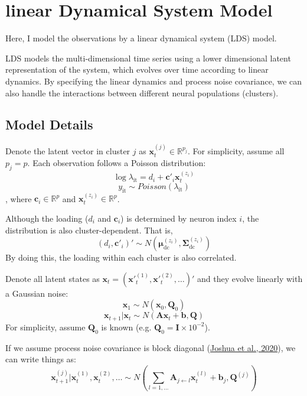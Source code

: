 \documentclass[]{article}
\begin{document}
\section{linear Dynamical System Model}
Here, I model the observations by a linear dynamical system (LDS) model.

LDS models the multi-dimensional time series using a lower dimensional latent representation of the system, which evolves over time according to linear dynamics. By specifying the linear dynamics and process noise covariance, we can also handle the interactions between different neural populations (clusters).

\subsection{Model Details}
Denote the latent vector in cluster \(j\) as
\(\mathbf{x}_{t}^{(j)} \in \mathbb{R}^{p_{j}}\). For simplicity, assume all \(p_{j} = p\). Each observation follows a Poisson distribution:
\[\log\lambda_{\text{it}} = d_{i} + \mathbf{c'}_{i}\mathbf{x}_{t}^{(z_{i})}\]
\[y_{\text{it}} \sim Poisson(\lambda_{\text{it}})\]
, where \(\mathbf{c}_{i} \in \mathbb{R}^{p}\) and
\(\mathbf{x}_{t}^{(z_{i})} \in \mathbb{R}^{p}\).

Although the loading (\(d_{i}\) and \(\mathbf{c}_{i}\)) is determined by neuron index \(i\), the distribution is also cluster-dependent. That is,
\[\left( d_{i},\mathbf{c}'_{i} \right)' \sim N(\bm{\mu}_{\text{dc}}^{\left( z_{i} \right)},\mathbf{\Sigma}_{\text{dc}}^{(z_{i})})\]
By doing this, the loading within each cluster is also correlated.

Denote all latent states as \(\mathbf{x}_{t} = \left( {\mathbf{x'}_{t}^{(1)}},{\mathbf{x'}_{t}^{(2)}},\ldots \right)'\) and they evolve linearly with a Gaussian noise:
\[\mathbf{x}_{1} \sim N(\mathbf{x}_{0},\mathbf{Q}_{0})\]
\[\mathbf{x}_{t + 1}|\mathbf{x}_{t} \sim N(\mathbf{A}\mathbf{x}_{t} + \mathbf{b},\mathbf{Q})\]
For simplicity, assume \(\mathbf{Q}_{0}\) is known (e.g.
\(\mathbf{Q}_{0} = \mathbf{I} \times 10^{-2}\)).

If we assume process noise covariance is block diagonal (\href{https://papers.nips.cc/paper/2020/hash/aa1f5f73327ba40d47ebce155e785aaf-Abstract.html}{Joshua et al., 2020}), we can write things as:
\[\mathbf{x}_{t + 1}^{(j)}|\mathbf{x}_{t}^{(1)},\mathbf{x}_{t}^{(2)},\ldots \sim N(\sum_{l = 1,\ldots}^{}\mathbf{A}_{j \leftarrow l}\mathbf{x}_{t}^{(l)} + \mathbf{b}_{j},\mathbf{Q}^{(j)})\]
\end{document}
